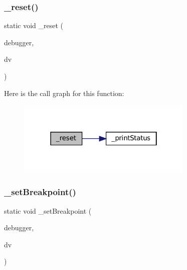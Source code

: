 \subsubsection{\texorpdfstring{\+\_\+reset()}{\_reset()}}
{\footnotesize\ttfamily static void \+\_\+reset (\begin{DoxyParamCaption}\item[{struct C\+L\+I\+Debugger $\ast$}]{debugger,  }\item[{struct C\+L\+I\+Debug\+Vector $\ast$}]{dv }\end{DoxyParamCaption})\hspace{0.3cm}{\ttfamily [static]}}

Here is the call graph for this function\+:
\nopagebreak
\begin{figure}[H]
\begin{center}
\leavevmode
\includegraphics[width=238pt]{debugger_2cli-debugger_8c_ab05ea35fc2d35b4a05bad6c08c1d8336_cgraph}
\end{center}
\end{figure}
\mbox{\label{debugger_2cli-debugger_8c_a0a52c3456f6b68ef9b560a42b816794c}} 
\subsubsection{\texorpdfstring{\+\_\+set\+Breakpoint()}{\_setBreakpoint()}}
{\footnotesize\ttfamily static void \+\_\+set\+Breakpoint (\begin{DoxyParamCaption}\item[{struct C\+L\+I\+Debugger $\ast$}]{debugger,  }\item[{struct C\+L\+I\+Debug\+Vector $\ast$}]{dv }\end{DoxyParamCaption})\hspace{0.3cm}{\ttfamily [static]}}

